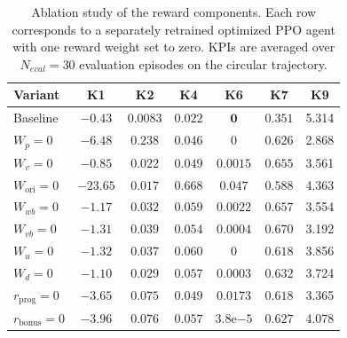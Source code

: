 \documentclass{ieeeaccess}
\begin{document}
\begin{table}[!t]
    \centering
    \caption{Ablation study of the reward components. Each row corresponds to a separately retrained optimized
    PPO
    agent with one reward weight set to zero. KPIs are averaged over $N_{eval}=30$ evaluation
    episodes on the circular trajectory.}
    \label{tab:reward_ablation}
    \renewcommand{\arraystretch}{1.2}
    \setlength{\tabcolsep}{3pt}
    \begin{tabular}{lcccccc}
        \toprule
        \textbf{Variant} & \textbf{K1} & \textbf{K2} & \textbf{K4} & \textbf{K6} & \textbf{K7} & \textbf{K9} \\
        \midrule
        Baseline            & $\mathbf{-0.43}$   & $\mathbf{0.0083}$ & $\mathbf{0.022}$ & $\mathbf{0}$      & $\mathbf{0.351}$ & 5.314 \\
        $W_p = 0$           & $-6.48$            & $0.238$           & $0.046$          & $0$               & $0.626$          & 2.868 \\
        $W_v = 0$           & $-0.85$            & $0.022$           & $0.049$          & $0.0015$          & $0.655$          & 3.561 \\
        $W_{\mathrm{ori}}=0$& $-23.65$            & $0.017$           & $0.668$          & $0.047$           & $0.588$          & 4.363 \\
        $W_{wb} = 0$        & $-1.17$            & $0.032$           & $0.059$          & $0.0022$          & $0.657$          & 3.554 \\
        $W_{vb} = 0$        & $-1.31$            & $0.039$           & $0.054$          & $0.0004$          & $0.670$          & 3.192 \\
        $W_u = 0$           & $-1.32$            & $0.037$           & $0.060$          & $0$               & $0.618$          & 3.856 \\
        $W_d = 0$           & $-1.10$            & $0.029$           & $0.057$          & $0.0003$          & $0.632$          & 3.724 \\
        $r_{\text{prog}} = 0$   & $-3.65$        & $0.075$           & $0.049$          & $0.0173$          & $0.618$          & 3.365 \\
        $r_{\text{bonus}} = 0$  & $-3.96$        & $0.076$           & $0.057$          & $3.8\mathrm{e}{-5}$ & $0.627$        & 4.078 \\
        \bottomrule
    \end{tabular}
\end{table}
\end{document}
